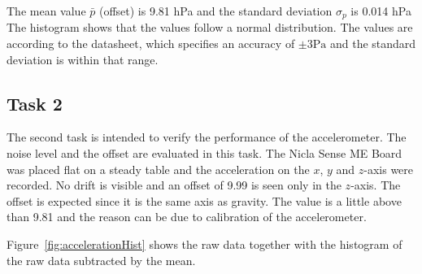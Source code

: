 \documentclass[DIV=14]{scrartcl}
\begin{document}
    The mean value $\bar{p}$ (offset) is 9.81 \si{\hecto\pascal} and the standard deviation $\sigma_p$ is 0.014 \si{\hecto\pascal}
    The histogram shows that the values follow a normal distribution.
    The values are according to the datasheet, which specifies an accuracy of $\pm3 \si{\pascal}$ and
    the standard deviation is within that range.

    \clearpage


    \subsection*{Task 2}
    The second task is intended to verify the performance of the accelerometer.
    The noise level and the offset are evaluated in this task.
    The Nicla Sense ME Board was placed flat on a steady table and the acceleration on the $x$, $y$ and $z$-axis were recorded.
    No drift is visible and an offset of 9.99 \si{} is seen only in the $z$-axis.
    The offset is expected since it is the same axis as gravity.
    The value is a little above than 9.81\si{} and the reason can be due to calibration of
    the accelerometer.

    Figure~\ref{fig:accelerationHist} shows the raw data together with the histogram of the raw data subtracted by the mean.
\end{document}
